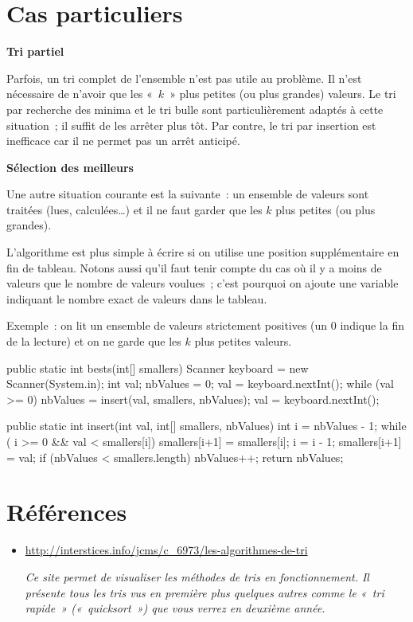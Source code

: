 \section{Cas particuliers}

	{\sffamily\bfseries\upshape
	Tri partiel}

		Parfois, un tri complet de l’ensemble n'est pas utile au problème. Il
		n'est nécessaire de n'avoir que les «~$k$~» plus petites (ou plus grandes)
		valeurs. Le tri par recherche des minima et le tri bulle sont
		particulièrement adaptés à cette situation~; il suffit de les arrêter
		plus tôt. Par contre, le tri par insertion est inefficace car il ne
		permet pas un arrêt anticipé.

	{\sffamily\bfseries\upshape
	Sélection des meilleurs}

		Une autre situation courante est la suivante~: un ensemble de valeurs
		sont traitées (lues, calculées\dots) et il ne faut garder que les
		$k$ plus petites (ou plus grandes).
		
		L’algorithme est plus simple à écrire si on utilise
		une position supplémentaire en fin de tableau. Notons aussi qu’il faut
		tenir compte du cas où il y a moins de valeurs que le nombre de valeurs
		voulues~; c’est pourquoi on ajoute une variable indiquant le nombre
		exact de valeurs dans le tableau.

		Exemple~:
		on lit un ensemble de valeurs strictement positives (un 0 indique la fin
		de la lecture) et on ne garde que les $k$ plus petites valeurs.

		\begin{java}
public static int bests(int[] smallers){
	Scanner keyboard = new Scanner(System.in);
	int val;
	nbValues = 0;
	val = keyboard.nextInt();
	while (val >= 0){
		nbValues = insert(val, smallers, nbValues);
		val = keyboard.nextInt();
	}
}

public static int insert(int val, int[] smallers, nbValues){
	int i = nbValues - 1;
	while ( i >= 0 && val < smallers[i]){
		smallers[i+1] = smallers[i];
		i = i - 1;
	}
	smallers[i+1] = val;
	if (nbValues < smallers.length){
		nbValues++;
	}
	return nbValues;
}
		\end{java}

\section{Références}

	\begin{itemize}
		\item {
			\url{http://interstices.info/jcms/c_6973/les-algorithmes-de-tri}

			\textit{Ce site \cite{trivisuels} permet de visualiser les méthodes
			de tris en fonctionnement. Il présente tous les tris vus en première
			plus quelques autres comme le «~tri rapide~» («~quicksort~») que vous
			verrez en deuxième année.}}

	\end{itemize}
